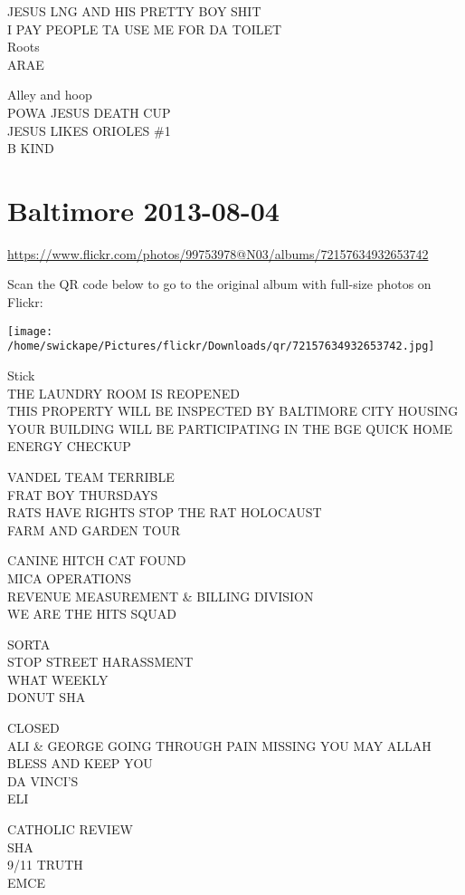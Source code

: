 \documentclass[10pt,letterpaper]{article}
\begin{document}
JESUS LNG AND HIS PRETTY BOY SHIT\\
I PAY PEOPLE TA USE ME FOR DA TOILET\\
Roots\\
ARAE

Alley and hoop\\
POWA JESUS DEATH CUP\\
JESUS LIKES ORIOLES \#1\\
B KIND


\section*{Baltimore 2013-08-04}

\url{https://www.flickr.com/photos/99753978@N03/albums/72157634932653742}

Scan the QR code below to go to the original album with full-size photos on Flickr:

\texttt{[image: /home/swickape/Pictures/flickr/Downloads/qr/72157634932653742.jpg]}


Stick\\
THE LAUNDRY ROOM IS REOPENED\\
THIS PROPERTY WILL BE INSPECTED BY BALTIMORE CITY HOUSING\\
YOUR BUILDING WILL BE PARTICIPATING IN THE BGE QUICK HOME ENERGY CHECKUP

VANDEL TEAM TERRIBLE\\
FRAT BOY THURSDAYS\\
RATS HAVE RIGHTS STOP THE RAT HOLOCAUST\\
FARM AND GARDEN TOUR

CANINE HITCH CAT FOUND\\
MICA OPERATIONS\\
REVENUE MEASUREMENT \& BILLING DIVISION\\
WE ARE THE HITS SQUAD

SORTA\\
STOP STREET HARASSMENT\\
WHAT WEEKLY\\
DONUT SHA

CLOSED\\
ALI \& GEORGE GOING THROUGH PAIN MISSING YOU MAY ALLAH BLESS AND KEEP YOU\\
DA VINCI'S\\
ELI

CATHOLIC REVIEW\\
SHA\\
9/11 TRUTH\\
EMCE
\end{document}
